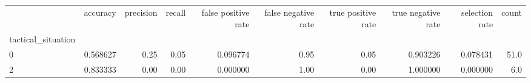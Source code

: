 \begin{tabular}{lrrrrrrrrr}
\toprule
{} &  accuracy &  precision &  recall &  false positive rate &  false negative rate &  true positive rate &  true negative rate &  selection rate &  count \\
tactical\_situation &           &            &         &                      &                      &                     &                     &                 &        \\
\midrule
0                  &  0.568627 &       0.25 &    0.05 &             0.096774 &                 0.95 &                0.05 &            0.903226 &        0.078431 &   51.0 \\
2                  &  0.833333 &       0.00 &    0.00 &             0.000000 &                 1.00 &                0.00 &            1.000000 &        0.000000 &    6.0 \\
\bottomrule
\end{tabular}
